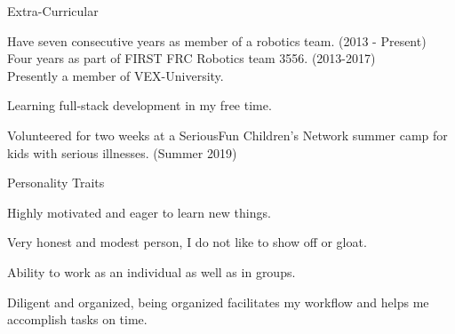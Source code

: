 \documentclass{resume} %
\begin{document}
\begin{rSection}{Extra-Curricular} \itemsep -3pt
	\item Have seven consecutive years as member of a robotics team. (2013 - Present)\\
	Four years as part of FIRST FRC Robotics team 3556. (2013-2017)\\
	Presently a member of VEX-University.
	\item Learning full-stack development in my free time.
	\item Volunteered for two weeks at a SeriousFun Children's Network summer camp for kids with serious illnesses. (Summer 2019)
\end{rSection}

\begin{rSection}{Personality Traits}
	\item Highly motivated and eager to learn new things.
	\item Very honest and modest person, I do not like to show off or gloat.
	\item Ability to work as an individual as well as in groups.
	\item Diligent and organized, being organized facilitates my workflow and helps me accomplish tasks on time.
\end{rSection}
\end{document}

